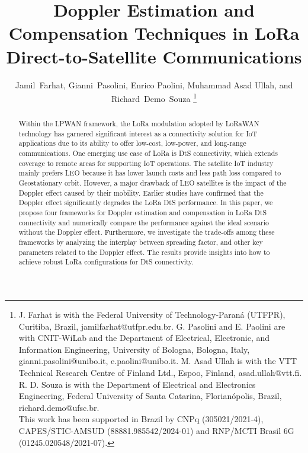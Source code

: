 \documentclass{IEEEtran}
\begin{document}

\title{Doppler Estimation and Compensation Techniques in LoRa Direct-to-Satellite Communications}

\author{Jamil~Farhat, Gianni~Pasolini, Enrico Paolini, Muhammad Asad Ullah, and Richard~Demo~Souza%
\thanks{J. Farhat is with the Federal University of Technology-Paraná (UTFPR), Curitiba, Brazil, jamilfarhat@utfpr.edu.br. G. Pasolini and E. Paolini are with CNIT-WiLab and the Department of Electrical, Electronic, and Information Engineering, University of Bologna, Bologna, Italy, gianni.pasolini@unibo.it, e.paolini@unibo.it. M. Asad Ullah is with the VTT Technical Research Centre of Finland Ltd., Espoo, Finland, asad.ullah@vtt.fi. R. D. Souza is with the Department of Electrical and Electronics Engineering, Federal University of Santa Catarina, Florianópolis, Brazil, richard.demo@ufsc.br. \\
This work has been supported in Brazil by CNPq (305021/2021-4), CAPES/STIC-AMSUD (88881.985542/2024-01) and RNP/MCTI Brasil 6G (01245.020548/2021-07).}
}

\maketitle

\begin{abstract}
Within the \ac{LPWAN} framework, the \ac{LoRa} modulation adopted by \ac{LoRaWAN} technology has garnered significant interest as a connectivity solution for \ac{IoT} applications due to its ability to offer low-cost, low-power, and long-range communications. One emerging use case of \ac{LoRa} is \ac{DtS} connectivity, which extends coverage to remote areas for supporting \ac{IoT} operations. The satellite \ac{IoT}  industry mainly prefers \ac{LEO} because it has lower launch costs and less path loss compared to Geostationary orbit. However, a major drawback of \ac{LEO} satellites is the impact of the Doppler effect caused by their mobility. Earlier studies have confirmed that the Doppler effect significantly degrades the \ac{LoRa} \ac{DtS} performance. In this paper, we propose four frameworks for Doppler estimation and compensation in \ac{LoRa} \ac{DtS} connectivity and numerically compare the performance against the ideal scenario without the Doppler effect. Furthermore, we investigate the trade-offs among these frameworks by analyzing the interplay between spreading factor, and other key parameters related to the Doppler effect. The results provide insights into how to achieve robust \ac{LoRa} configurations for \ac{DtS} connectivity.
\end{abstract}
\end{document}
